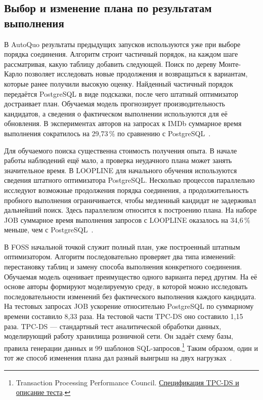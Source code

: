 \documentclass[a4paper, final]{article}
\begin{document}
	\subsection{Выбор и изменение плана по результатам выполнения}
	
	В AutoQuo результаты предыдущих запусков используются уже при выборе порядка соединения. Алгоритм строит частичный порядок, на каждом шаге рассматривая, какую таблицу добавить следующей. Поиск по дереву Монте-Карло позволяет исследовать новые продолжения и возвращаться к вариантам, которые ранее получили высокую оценку. Найденный частичный порядок передаётся PostgreSQL в виде подсказки, после чего штатный оптимизатор достраивает план. Обучаемая модель прогнозирует производительность кандидатов, а сведения о фактическом выполнении используются для её обновления. В экспериментах авторов на запросах к IMDb суммарное время выполнения сократилось на 29,73\,\% по сравнению с PostgreSQL~\cite{autoquo2024}.
	
	Для обучаемого поиска существенна стоимость получения опыта. В начале работы наблюдений ещё мало, а проверка неудачного плана может занять значительное время. В LOOPLINE для начального обучения используются сведения штатного оптимизатора PostgreSQL. Несколько процессов параллельно исследуют возможные продолжения порядка соединения, а продолжительность пробного выполнения ограничивается, чтобы медленный кандидат не задерживал дальнейший поиск. Здесь параллелизм относится к построению плана. На наборе JOB суммарное время выполнения запросов с LOOPLINE оказалось на 34,6\,\% меньше, чем с PostgreSQL~\cite{loopline2025}.
	
	В FOSS начальной точкой служит полный план, уже построенный штатным оптимизатором. Алгоритм последовательно проверяет два типа изменений: перестановку таблиц и замену способа выполнения конкретного соединения. Обучаемая модель оценивает преимущество одного варианта перед другим. На её основе авторы формируют моделируемую среду, в которой можно исследовать последовательности изменений без фактического выполнения каждого кандидата. На тестовых запросах JOB ускорение относительно PostgreSQL по суммарному времени составило 8,33 раза. На тестовой части TPC-DS оно составило 1,15 раза. TPC-DS --- стандартный тест аналитической обработки данных, моделирующий работу хранилища розничной сети. Он задаёт схему базы, правила генерации данных и 99 шаблонов SQL-запросов.\footnote{Transaction Processing Performance Council. \href{https://www.tpc.org/tpcds/}{Спецификация TPC-DS и описание теста}.} Таким образом, один и тот же способ изменения плана дал разный выигрыш на двух нагрузках~\cite{foss2024}.
	
\end{document}
